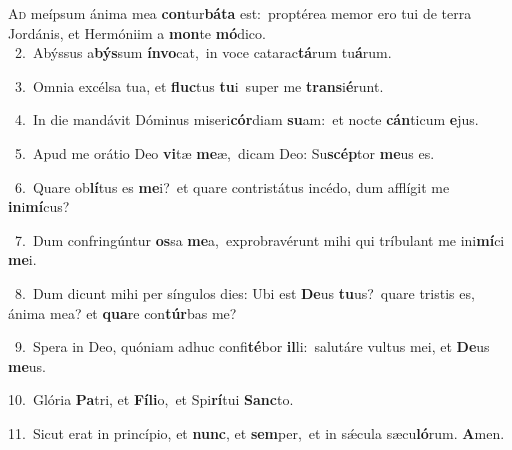 \lettrine{\initial\textcolor{\initialcolor}{A}}{d} meípsum ánima mea \textbf{con}\-tur\-\textbf{bá}\-\textbf{ta} est:~\star proptérea memor ero tui de terra Jordánis, et Hermóniim a \textbf{mon}\-te \textbf{mó}\-dico.\\
{\numbfont\textcolor{\numbcolor}{~2.}}~Abýssus a\-\textbf{býs}\-sum \textbf{ín}\-\textbf{vo}cat,~\star in voce catarac\-\textbf{tá}\-rum tu\-\textbf{á}\-rum.\par
{\numbfont\textcolor{\numbcolor}{~3.}}~Omnia excélsa tua, et \textbf{fluc}\-tus \textbf{tu}\-i~\star super me \textbf{trans}\-i\-\textbf{é}\-runt.\par
{\numbfont\textcolor{\numbcolor}{~4.}}~In die mandávit Dóminus miseri\-\textbf{cór}\-diam \textbf{su}\-am:~\star et nocte \textbf{cán}\-ticum \textbf{e}\-jus.\par
{\numbfont\textcolor{\numbcolor}{~5.}}~Apud me orátio Deo \textbf{vi}\-tæ \textbf{me}\-æ,~\star dicam Deo: Su\-\textbf{scép}\-tor \textbf{me}\-us es.\par
{\numbfont\textcolor{\numbcolor}{~6.}}~Quare ob\-\textbf{lí}\-tus es \textbf{me}\-i?~\star et quare contristátus incédo, dum afflígit me \textbf{in}\-i\-\textbf{mí}\-cus?\par
{\numbfont\textcolor{\numbcolor}{~7.}}~Dum confringúntur \textbf{os}\-sa \textbf{me}\-a,~\star exprobravérunt mihi qui tríbulant me ini\-\textbf{mí}\-ci \textbf{me}\-i.\par
{\numbfont\textcolor{\numbcolor}{~8.}}~Dum dicunt mihi per síngulos dies: Ubi est \textbf{De}\-us \textbf{tu}\-us?~\star quare tristis es, ánima mea? et \textbf{qua}\-re con\-\textbf{túr}\-bas me?\par
{\numbfont\textcolor{\numbcolor}{~9.}}~Spera in Deo, quóniam adhuc confi\-\textbf{té}\-bor \textbf{il}\-li:~\star salutáre vultus mei, et \textbf{De}\-us \textbf{me}\-us.\par
{\numbfont\textcolor{\numbcolor}{10.}}~Glória \textbf{Pa}\-tri, et \textbf{Fí}\-\textbf{li}o,~\star et Spi\-\textbf{rí}\-tui \textbf{Sanc}\-to.\par
{\numbfont\textcolor{\numbcolor}{11.}}~Sicut erat in princípio, et \textbf{nunc}\-, et \textbf{sem}\-per,~\star et in sǽcula sæcu\-\textbf{ló}\-rum. \textbf{A}\-men.\par
